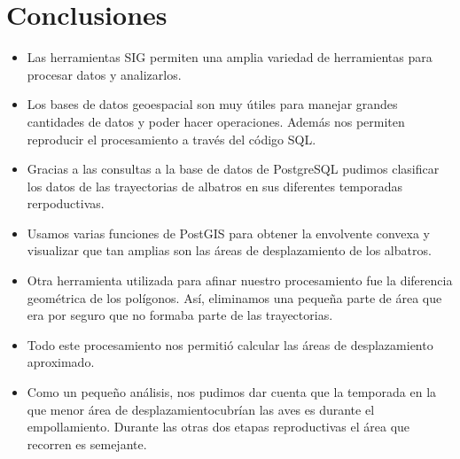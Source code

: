 \section{Conclusiones}

\begin{itemize}
    \item Las herramientas SIG permiten una amplia variedad de herramientas para
    procesar datos y analizarlos.
    \item Los bases de datos geoespacial son muy útiles para manejar grandes
    cantidades de datos y poder hacer operaciones. Además nos permiten
    reproducir el procesamiento a través del código SQL.
    \item Gracias a las consultas a la base de datos de PostgreSQL pudimos
    clasificar los datos de las trayectorias de albatros en sus diferentes
    temporadas rerpoductivas.
    \item Usamos varias funciones de PostGIS para obtener la envolvente convexa
    y visualizar que tan amplias son las áreas de desplazamiento de los
    albatros.
    \item Otra herramienta utilizada para afinar nuestro procesamiento fue la
    diferencia geométrica de los polígonos. Así, eliminamos una pequeña parte de
    área que era por seguro que no formaba parte de las trayectorias.
    \item Todo este procesamiento nos permitió calcular las áreas de
    desplazamiento aproximado.
    \item Como un pequeño análisis, nos pudimos dar cuenta que la temporada en
    la que menor área de desplazamientocubrían las aves es durante el
    empollamiento. Durante las otras dos etapas reproductivas el área que
    recorren es semejante.
\end{itemize}

